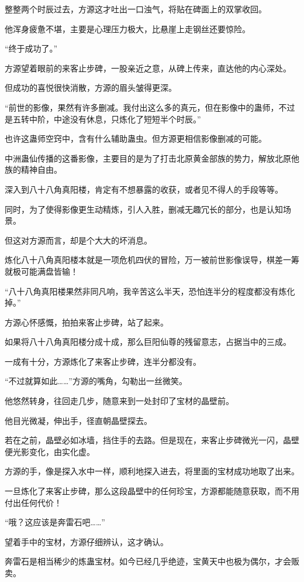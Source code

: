 \begin{this_body}
整整两个时辰过去，方源这才吐出一口浊气，将贴在碑面上的双掌收回。

他浑身疲惫不堪，主要是心理压力极大，比悬崖上走钢丝还要惊险。

“终于成功了。”

方源望着眼前的来客止步碑，一股亲近之意，从碑上传来，直达他的内心深处。

但成功的喜悦很快消散，方源的眉头皱得更深。

“前世的影像，果然有许多删减。我付出这么多的真元，但在影像中的蛊师，不过是五转中阶，中途没有休息，只炼化了短短半个时辰。”

也许这蛊师空窍中，含有什么辅助蛊虫。但方源更相信影像删减的可能。

中洲蛊仙传播的这番影像，主要目的是为了打击北原黄金部族的势力，解放北原他族的精神自由。

深入到八十八角真阳楼，肯定有不想暴露的收获，或者见不得人的手段等等。

同时，为了使得影像更生动精炼，引人入胜，删减无趣冗长的部分，也是认知场景。

但这对方源而言，却是个大大的坏消息。

炼化八十八角真阳楼本就是一项危机四伏的冒险，万一被前世影像误导，棋差一筹就极可能满盘皆输！

“八十八角真阳楼果然非同凡响，我辛苦这么半天，恐怕连半分的程度都没有炼化掉。”

方源心怀感慨，拍拍来客止步碑，站了起来。

如果将八十八角真阳楼分成十成，那么巨阳仙尊的残留意志，占据当中的三成。

一成有十分，方源炼化了来客止步碑，连半分都没有。

“不过就算如此……”方源的嘴角，勾勒出一丝微笑。

他悠然转身，往回走几步，随意来到一处封印了宝材的晶壁前。

他目光微凝，伸出手，径直朝晶壁探去。

若在之前，晶壁必如冰墙，挡住手的去路。但是现在，来客止步碑微光一闪，晶壁便光影变化，由实化虚。

方源的手，像是探入水中一样，顺利地探入进去，将里面的宝材成功地取了出来。

一旦炼化了来客止步碑，那么这段晶壁中的任何珍宝，方源都能随意获取，而不用付出任何代价！

“哦？这应该是奔雷石吧……”

望着手中的宝材，方源仔细辨认，这才确认。

奔雷石是相当稀少的炼蛊宝材。如今已经几乎绝迹，宝黄天中也极为偶尔，才会贩卖。


\end{this_body}
